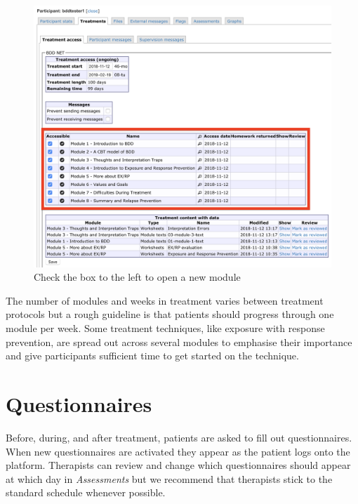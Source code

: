 \documentclass[]{book}
\theoremstyle{definition}
\theoremstyle{definition}
\theoremstyle{definition}
\theoremstyle{remark}
\begin{document}
\begin{figure}
\centering
\includegraphics{images/module-access.png}
\caption{Check the box to the left to open a new module}
\end{figure}

The number of modules and weeks in treatment varies between treatment
protocols but a rough guideline is that patients should progress through
one module per week. Some treatment techniques, like exposure with
response prevention, are spread out across several modules to emphasise
their importance and give participants sufficient time to get started on
the technique.

\hypertarget{questionnaires}{%
\section{Questionnaires}\label{questionnaires}}

Before, during, and after treatment, patients are asked to fill out
questionnaires. When new questionnaires are activated they appear as the
patient logs onto the platform. Therapists can review and change which
questionnaires should appear at which day in \emph{Assessments} but we
recommend that therapists stick to the standard schedule whenever
possible.
\end{document}

